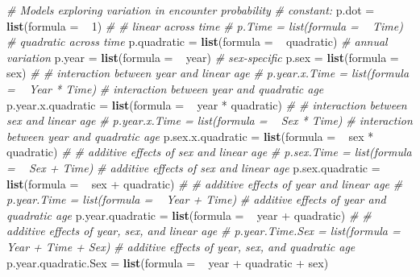 \documentclass[]{article}
\newenvironment{Shaded}{\begin{snugshade}}{\end{snugshade}}
\newcommand{\KeywordTok}[1]{\textcolor[rgb]{0.13,0.29,0.53}{\textbf{{#1}}}}
\newcommand{\DataTypeTok}[1]{\textcolor[rgb]{0.13,0.29,0.53}{{#1}}}
\newcommand{\DecValTok}[1]{\textcolor[rgb]{0.00,0.00,0.81}{{#1}}}
\newcommand{\StringTok}[1]{\textcolor[rgb]{0.31,0.60,0.02}{{#1}}}
\newcommand{\CommentTok}[1]{\textcolor[rgb]{0.56,0.35,0.01}{\textit{{#1}}}}
\newcommand{\NormalTok}[1]{{#1}}
\begin{document}
\begin{Shaded}
\begin{Highlighting}[]
    \CommentTok{# Models exploring variation in encounter probability}
    \CommentTok{# constant:}
    \NormalTok{p.dot =}\StringTok{ }\KeywordTok{list}\NormalTok{(}\DataTypeTok{formula =} \NormalTok{~}\StringTok{ }\DecValTok{1}\NormalTok{)}
    \CommentTok{# # linear across time}
    \CommentTok{# p.Time = list(formula = ~ Time)}
    \CommentTok{# quadratic across time}
    \NormalTok{p.quadratic =}\StringTok{ }\KeywordTok{list}\NormalTok{(}\DataTypeTok{formula =} \NormalTok{~}\StringTok{ }\NormalTok{quadratic)}
    \CommentTok{# annual variation}
    \NormalTok{p.year =}\StringTok{ }\KeywordTok{list}\NormalTok{(}\DataTypeTok{formula =} \NormalTok{~}\StringTok{ }\NormalTok{year)}
    \CommentTok{# sex-specific}
    \NormalTok{p.sex =}\StringTok{ }\KeywordTok{list}\NormalTok{(}\DataTypeTok{formula =} \NormalTok{~}\StringTok{ }\NormalTok{sex)}
    \CommentTok{# # interaction between year and linear age}
    \CommentTok{# p.year.x.Time = list(formula = ~ Year * Time)}
    \CommentTok{# interaction between year and quadratic age}
    \NormalTok{p.year.x.quadratic =}\StringTok{ }\KeywordTok{list}\NormalTok{(}\DataTypeTok{formula =} \NormalTok{~}\StringTok{ }\NormalTok{year *}\StringTok{ }\NormalTok{quadratic)}
    \CommentTok{# # interaction between sex and linear age}
    \CommentTok{# p.year.x.Time = list(formula = ~ Sex * Time)}
    \CommentTok{# interaction between year and quadratic age}
    \NormalTok{p.sex.x.quadratic =}\StringTok{ }\KeywordTok{list}\NormalTok{(}\DataTypeTok{formula =} \NormalTok{~}\StringTok{ }\NormalTok{sex *}\StringTok{ }\NormalTok{quadratic)}
    \CommentTok{# # additive effects of sex and linear age}
    \CommentTok{# p.sex.Time = list(formula = ~ Sex + Time)}
    \CommentTok{# additive effects of sex and linear age}
    \NormalTok{p.sex.quadratic =}\StringTok{ }\KeywordTok{list}\NormalTok{(}\DataTypeTok{formula =} \NormalTok{~}\StringTok{ }\NormalTok{sex +}\StringTok{ }\NormalTok{quadratic)}
    \CommentTok{# # additive effects of year and linear age    }
    \CommentTok{# p.year.Time = list(formula = ~ Year + Time)}
    \CommentTok{# additive effects of year and quadratic age    }
    \NormalTok{p.year.quadratic =}\StringTok{ }\KeywordTok{list}\NormalTok{(}\DataTypeTok{formula =} \NormalTok{~}\StringTok{ }\NormalTok{year +}\StringTok{ }\NormalTok{quadratic)}
    \CommentTok{# # additive effects of year, sex, and linear age}
    \CommentTok{# p.year.Time.Sex = list(formula = ~ Year + Time + Sex)}
    \CommentTok{# additive effects of year, sex, and quadratic age}
    \NormalTok{p.year.quadratic.Sex =}\StringTok{ }\KeywordTok{list}\NormalTok{(}\DataTypeTok{formula =} \NormalTok{~}\StringTok{ }\NormalTok{year +}\StringTok{ }\NormalTok{quadratic +}\StringTok{ }\NormalTok{sex)}
    

\end{Highlighting}
\end{Shaded}
\end{document}
